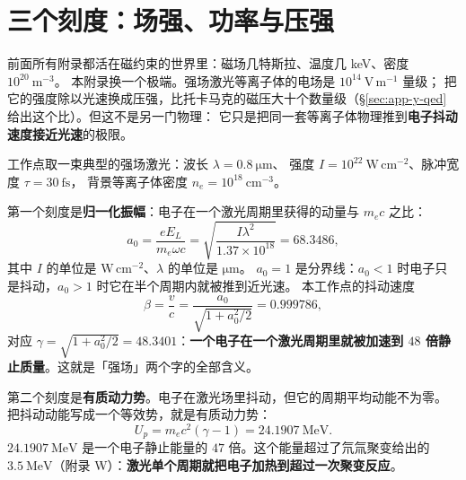 
\section{三个刻度：场强、功率与压强}
\label{sec:app-y-scales}

前面所有附录都活在磁约束的世界里：磁场几特斯拉、温度几 keV、密度 $10^{20}\ \mathrm{m^{-3}}$。
本附录换一个极端。强场激光等离子体的电场是 $10^{14}\ \mathrm{V\,m^{-1}}$ 量级；
把它的强度除以光速换成压强，比托卡马克的磁压大十个数量级（\S\ref{sec:app-y-qed} 给出这个比）。但这不是另一门物理：
它只是把同一套等离子体物理推到\textbf{电子抖动速度接近光速}的极限。

工作点取一束典型的强场激光：波长 $\lambda = 0.8\ \mathrm{\mu m}$、
强度 $I = 10^{22}\ \mathrm{W\,cm^{-2}}$、脉冲宽度 $\tau = 30\ \mathrm{fs}$，
背景等离子体密度 $n_e = 10^{18}\ \mathrm{cm^{-3}}$。

第一个刻度是\textbf{归一化振幅}：电子在一个激光周期里获得的动量与 $m_ec$ 之比：
\begin{equation}
a_0 = \frac{eE_L}{m_e\omega c}
= \sqrt{\frac{I\lambda^2}{1.37\times10^{18}}} = 68.3486,
\label{eq:app-y-a0}
\end{equation}
其中 $I$ 的单位是 $\mathrm{W\,cm^{-2}}$、$\lambda$ 的单位是 $\mathrm{\mu m}$。
$a_0=1$ 是分界线：$a_0<1$ 时电子只是抖动，$a_0>1$ 时它在半个周期内就被推到近光速。
本工作点的抖动速度
\begin{equation}
\beta = \frac{v}{c} = \frac{a_0}{\sqrt{1+a_0^2/2}} = 0.999786,
\label{eq:app-y-up}
\end{equation}
对应 $\gamma = \sqrt{1+a_0^2/2} = 48.3401$：\textbf{一个电子在一个激光周期里就被加速到
$48$ 倍静止质量}。这就是「强场」两个字的全部含义。

第二个刻度是\textbf{有质动力势}。电子在激光场里抖动，但它的周期平均动能不为零。
把抖动动能写成一个等效势，就是有质动力势：
\begin{equation}
U_p = m_ec^2\left(\gamma-1\right) = 24.1907\ \mathrm{MeV}.
\label{eq:app-y-es}
\end{equation}
$24.1907\ \mathrm{MeV}$ 是一个电子静止能量的 $47$ 倍。这个能量超过了氘氚聚变给出的
$3.5\ \mathrm{MeV}$（附录 W）：\textbf{激光单个周期就把电子加热到超过一次聚变反应}。

